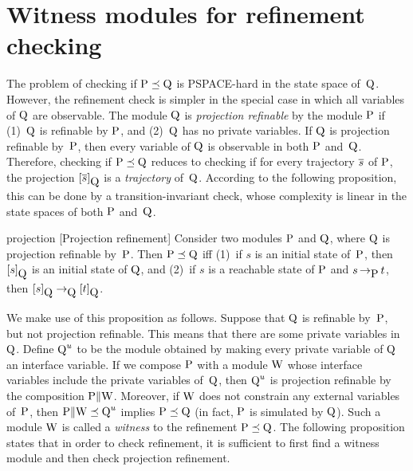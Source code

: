 \section{Witness modules for refinement checking}
\label{sec:witness_modules}
The problem of checking if $\mbox{P}\preceq\mbox{Q}$ is PSPACE-hard in the state
space of~$\mbox{Q}$.  However, the refinement check is simpler in the special
case in which all variables of $\mbox{Q}$ are observable.  The module $\mbox{Q}$ is
{\em projection refinable\/} by the module $\mbox{P}$ if (1)~$\mbox{Q}$ is refinable
by $\mbox{P}$, and (2)~$\mbox{Q}$ has no private variables.  If $\mbox{Q}$ is projection
refinable by~$\mbox{P}$, then every variable of $\mbox{Q}$ is observable in both $\mbox{P}$
and~$\mbox{Q}$.  Therefore, checking if $\mbox{P}\preceq\mbox{Q}$ reduces to checking if
for every trajectory $\overline{s}$ of $\mbox{P}$, the projection 
$[\overline{s} ]_{\mbox{Q}}$
is a {\em trajectory\/} of~$\mbox{Q}$.  According to the following proposition,
this can be done by a transition-invariant check, whose complexity is
linear in the state spaces of both $\mbox{P}$ and~$\mbox{Q}$.

\begin {proposition}{projection}
  [Projection refinement]
  Consider two modules $\mbox{P}$ and $\mbox{Q}$, where $\mbox{Q}$ is projection refinable 
  by~$\mbox{P}$.
  Then $\mbox{P} \preceq \mbox{Q}$ iff 
  (1)~if $s$ is an initial state of~$\mbox{P}$, then $[s]_{\mbox{Q}}$
        is an initial state of $\mbox{Q}$, and
  (2)~if $s$ is a reachable state of $\mbox{P}$ and $s\, {\to}_{\mbox{P}}\, t$,
        then $[s]_{\mbox{Q}} \to_{\mbox{Q}} [t]_{\mbox{Q}}$.
\end {proposition}

\mypar
\noindent
We make use of this proposition as follows.  Suppose that $\mbox{Q}$ is refinable
by~$\mbox{P}$, but not projection refinable.  This means that there are some
private variables in $\mbox{Q}$.  Define $\mbox{Q}^u$ to be the module obtained by
making every private variable of $\mbox{Q}$ an interface variable.  If we compose
$\mbox{P}$ with a module $\mbox{W}$ whose interface variables include the private
variables of~$\mbox{Q}$, then $\mbox{Q}^u$ is projection refinable by the
composition $\mbox{P}\|\mbox{W}$.  Moreover, if $\mbox{W}$ does not constrain any external
variables of~$\mbox{P}$, then $\mbox{P}\|\mbox{W}\preceq\mbox{Q}^u$ implies
$\mbox{P}\preceq\mbox{Q}$ (in fact, $\mbox{P}$ is simulated by $\mbox{Q}$). 
Such a module $\mbox{W}$ is called a {\em witness\/} to the
refinement $\mbox{P}\preceq\mbox{Q}$.  The following proposition states that in order
to check refinement, it is sufficient to first find a witness module and then
check projection refinement.

